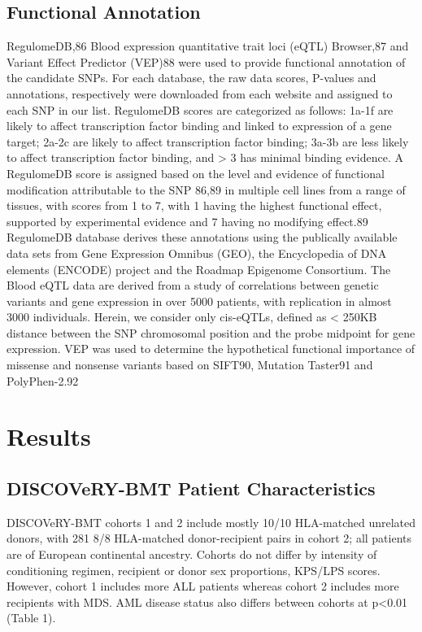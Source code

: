 \documentclass[]{DissertateUSU}
\begin{document}
\subsection{Functional Annotation}\label{functional-annotation}

RegulomeDB,86 Blood expression quantitative trait loci (eQTL) Browser,87
and Variant Effect Predictor (VEP)88 were used to provide functional
annotation of the candidate SNPs. For each database, the raw data
scores, P-values and annotations, respectively were downloaded from each
website and assigned to each SNP in our list. RegulomeDB scores are
categorized as follows: 1a-1f are likely to affect transcription factor
binding and linked to expression of a gene target; 2a-2c are likely to
affect transcription factor binding; 3a-3b are less likely to affect
transcription factor binding, and \textgreater{} 3 has minimal binding
evidence. A RegulomeDB score is assigned based on the level and evidence
of functional modification attributable to the SNP 86,89 in multiple
cell lines from a range of tissues, with scores from 1 to 7, with 1
having the highest functional effect, supported by experimental evidence
and 7 having no modifying effect.89 RegulomeDB database derives these
annotations using the publically available data sets from Gene
Expression Omnibus (GEO), the Encyclopedia of DNA elements (ENCODE)
project and the Roadmap Epigenome Consortium. The Blood eQTL data are
derived from a study of correlations between genetic variants and gene
expression in over 5000 patients, with replication in almost 3000
individuals. Herein, we consider only cis-eQTLs, defined as \textless{}
250KB distance between the SNP chromosomal position and the probe
midpoint for gene expression. VEP was used to determine the hypothetical
functional importance of missense and nonsense variants based on SIFT90,
Mutation Taster91 and PolyPhen-2.92

\section{Results}\label{results}

\subsection{DISCOVeRY-BMT Patient
Characteristics}\label{discovery-bmt-patient-characteristics}

DISCOVeRY-BMT cohorts 1 and 2 include mostly 10/10 HLA-matched unrelated
donors, with 281 8/8 HLA-matched donor-recipient pairs in cohort 2; all
patients are of European continental ancestry. Cohorts do not differ by
intensity of conditioning regimen, recipient or donor sex proportions,
KPS/LPS scores. However, cohort 1 includes more ALL patients whereas
cohort 2 includes more recipients with MDS. AML disease status also
differs between cohorts at p\textless{}0.01 (Table 1).
\end{document}
